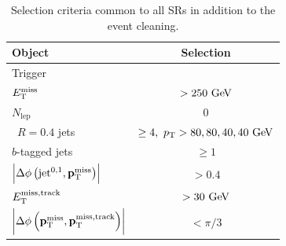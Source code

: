 			\begin{table}[htbp]
			\caption{Selection criteria common to all \acp{SR} in addition to the event cleaning.}
				\begin{center}
				\renewcommand{\arraystretch}{1.4}
				    \begin{tabular}{lc} 
				    	\toprule
				    	\textbf{Object} & \textbf{Selection} \\
				    	\toprule
				    	Trigger & \met \\ 
					   $E_{\mathrm{T}}^{\mathrm{miss}}$ & $> 250\GeV$ \\ 
					   \midrule
					   $N_{\mathrm{lep}}$ & $0$ \\ 
					   \antikt\ $R=0.4$ jets & $\ge 4,~\pt>80,80,40,40 \gev$ \\ 
					   $b$-tagged jets & $\ge1$ \\ \midrule
					   $\left|\Delta\phi\left(\mathrm{jet}^{0,1},\mathbf{p}_\mathrm{T}^\mathrm{miss}\right)\right|$ & $> 0.4$ \\ 
					   $E_{\mathrm{T}}^{\mathrm{miss, track}}$  & $> 30 \gev$ \\  
					   $\left|\Delta\phi\left(\mathbf{p}_\mathrm{T}^\mathrm{miss},\mathbf{p}_{\mathrm{T}}^{\mathrm{miss, track}}\right)\right|$ & $<\pi/3$ \\
					   \bottomrule
				    \end{tabular}
					\end{center}
			\label{tab:SRcommon}
			\end{table}





